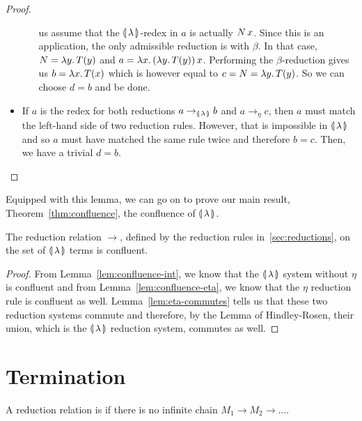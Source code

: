 \begin{proof}
\begin{itemize}
\begin{itemize}
      us assume that the $\llparenthesis \, \lambda \, \rrparenthesis$-redex in $a$ is actually
      $N\,x$. Since this is an application, the only admissible
      reduction is with $\beta$. In that case, $N = \lambda y.\, T(y)$ and
      $a = \lambda x.\, (\lambda y.\, T(y))\,x$. Performing the
      $\beta$-reduction gives us $b = \lambda x.\, T(x)$ which is however equal
      to $c = N = \lambda y.\, T(y)$. So we can choose $d = b$ and be done.
    \end{itemize}
  \item If $a$ is the redex for both reductions $a \to_{\llparenthesis \, \lambda \, \rrparenthesis} b$ and
    $a \to_\eta c$, then $a$ must match the left-hand side of two reduction
    rules. However, that is impossible in $\llparenthesis \, \lambda \, \rrparenthesis$ and so $a$ must have
    matched the same rule twice and therefore $b = c$. Then, we have a
    trivial $d = b$.
  \end{itemize}
\end{proof}

Equipped with this lemma, we can go on to prove our main result,
Theorem~\ref{thm:confluence}, the confluence of $\llparenthesis \, \lambda \, \rrparenthesis$.

\begin{theorem}\label{thm:confluence}
  
  The reduction relation $\to$, defined by the reduction rules
  in~\ref{sec:reductions}, on the set of $\llparenthesis \, \lambda \, \rrparenthesis$ terms is
  confluent.
\end{theorem}

\begin{proof}
  From Lemma~\ref{lem:confluence-int}, we know that the $\llparenthesis \, \lambda \, \rrparenthesis$
  system without $\eta$ is confluent and from
  Lemma~\ref{lem:confluence-eta}, we know that the $\eta$ reduction
  rule is confluent as well. Lemma~\ref{lem:eta-commutes} tells us that
  these two reduction systems commute and therefore, by the Lemma of
  Hindley-Rosen, their union, which is the $\llparenthesis \, \lambda \, \rrparenthesis$ reduction
  system, commutes as well.
\end{proof}


\section{Termination}
\label{sec:termination}

\begin{definition}
  A reduction relation is  if there is no infinite chain
  $M_1 \to M_2 \to \ldots$.
\end{definition}

